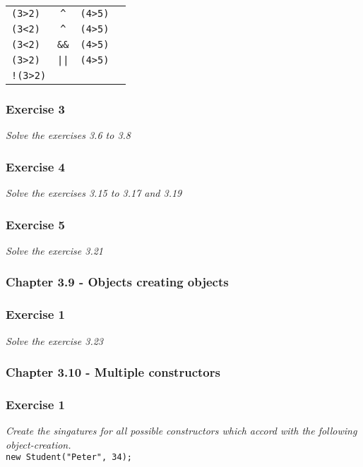 \begin{table}[h!]
	\begin{tabular}{l c l l}
	\lstinline!(3>2)! & \lstinline!^! & \lstinline!(4>5)! & \\
	\lstinline!(3<2)! & \lstinline!^! & \lstinline!(4>5)! & \\
	\lstinline!(3<2)! & \lstinline!&&! & \lstinline!(4>5)! &  \\
	\lstinline!(3>2)! & \lstinline!||! & \lstinline!(4>5)! & \\
	\lstinline?!(3>2)? &  &  &
	\end{tabular}
\end{table}

\subsubsection*{Exercise 3}
\textit{Solve the exercises 3.6 to 3.8}\\


\subsubsection*{Exercise 4}
\textit{Solve the exercises 3.15 to 3.17 and 3.19}\\


\subsubsection*{Exercise 5}
\textit{Solve the exercise 3.21}\\

\subsubsection{Chapter 3.9 - Objects creating objects}

\subsubsection*{Exercise 1}
\textit{Solve the exercise 3.23}\\

\subsubsection{Chapter 3.10 - Multiple constructors}

\subsubsection*{Exercise 1}
\textit{Create the singatures for all possible constructors which accord
with the following object-creation.}\\
\lstinline{new Student("Peter", 34);}


